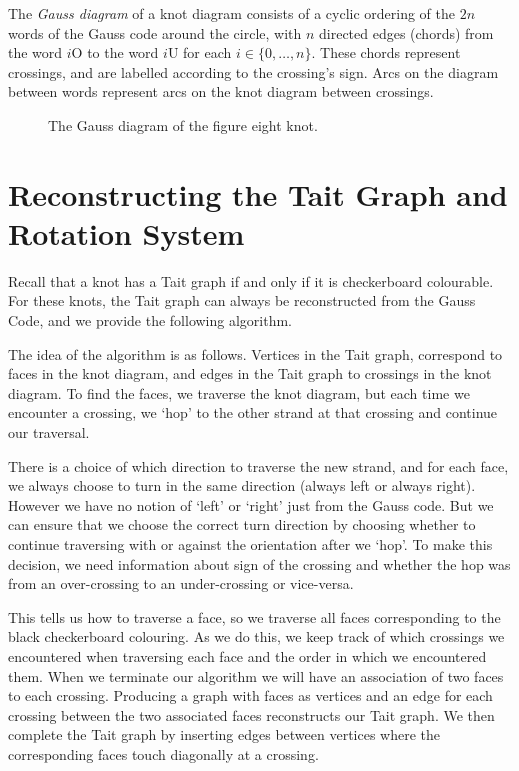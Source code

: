 \documentclass[12pt]{report}
\renewcommand{\over}{\text{O}}
\newcommand{\under}{\text{U}}
\theoremstyle{upright}
\begin{document}
The \textit{Gauss diagram} of a knot diagram consists of a cyclic ordering of the $2n$ words of the Gauss code around the circle, with $n$ directed edges (chords) from the word $i\over$ to the word $i\under$ for each $i \in \{0, \dots, n\}$. These chords represent crossings, and are labelled according to the crossing's sign. Arcs on the diagram between words represent arcs on the knot diagram between crossings.

\begin{figure}[hbt!]
	\centering
	\def\svgscale{1.35}
	
	
	\caption{The Gauss diagram of the figure eight knot.}
	\label{fig:gauss_diagram_figure_eight}
\end{figure}


\section{Reconstructing the Tait Graph and Rotation System}

Recall that a knot has a Tait graph if and only if it is checkerboard colourable. For these knots, the Tait graph can always be reconstructed from the Gauss Code, and we provide the following algorithm.
	
The idea of the algorithm is as follows. Vertices in the Tait graph, correspond to faces in the knot diagram, and edges in the Tait graph to crossings in the knot diagram. To find the faces, we traverse the knot diagram, but each time we encounter a crossing, we `hop' to the other strand at that crossing and continue our traversal.

There is a choice of which direction to traverse the new strand, and for each face, we always choose to turn in the same direction (always left or always right). However we have no notion of `left' or `right' just from the Gauss code. But we can ensure that we choose the correct turn direction by choosing whether to continue traversing with or against the orientation after we `hop'. To make this decision, we need information about sign of the crossing and whether the hop was from an over-crossing to an under-crossing or vice-versa.

This tells us how to traverse a face, so we traverse all faces corresponding to the black checkerboard colouring. As we do this, we keep track of which crossings we encountered when traversing each face and the order in which we encountered them. When we terminate our algorithm we will have an association of two faces to each crossing. Producing a graph with faces as vertices and an edge for each crossing between the two associated faces reconstructs our Tait graph. We then complete the Tait graph by inserting edges between vertices where the corresponding faces touch diagonally at a crossing.
\end{document}
